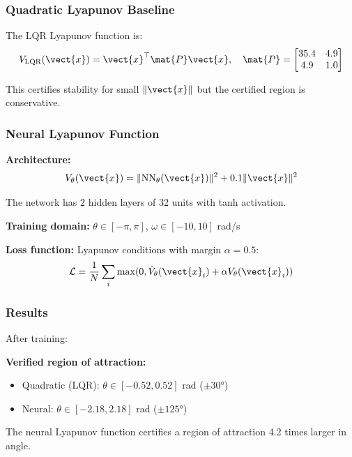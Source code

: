 \subsubsection{Quadratic Lyapunov Baseline}

The LQR Lyapunov function is:
\begin{equation}
V_{\text{LQR}}(\vect{x}) = \vect{x}^\top \mat{P} \vect{x}, \quad \mat{P} = \begin{bmatrix} 35.4 & 4.9 \\ 4.9 & 1.0 \end{bmatrix}
\end{equation}

This certifies stability for small $\|\vect{x}\|$ but the certified region is conservative.

\subsubsection{Neural Lyapunov Function}

\textbf{Architecture:}
\begin{equation}
V_\theta(\vect{x}) = \|\text{NN}_\theta(\vect{x})\|^2 + 0.1\|\vect{x}\|^2
\end{equation}

The network has 2 hidden layers of 32 units with tanh activation.

\textbf{Training domain:} $\theta \in [-\pi, \pi]$, $\omega \in [-10, 10]$ rad/s

\textbf{Loss function:} Lyapunov conditions with margin $\alpha = 0.5$:
\begin{equation}
\mathcal{L} = \frac{1}{N}\sum_i \max(0, \dot{V}_\theta(\vect{x}_i) + \alpha V_\theta(\vect{x}_i))
\end{equation}

\subsubsection{Results}

After training:

\textbf{Verified region of attraction:}
\begin{itemize}
    \item Quadratic (LQR): $\theta \in [-0.52, 0.52]$ rad ($\pm 30°$)
    \item Neural: $\theta \in [-2.18, 2.18]$ rad ($\pm 125°$)
\end{itemize}

The neural Lyapunov function certifies a region of attraction 4.2 times larger in angle.

